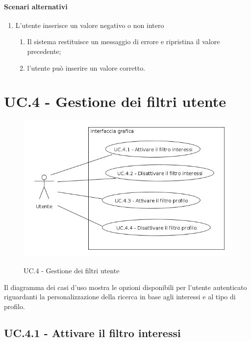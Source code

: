 \documentclass[10pt,a4paper,headinclude,footinclude,hidelinks]{scrreprt} %
\begin{document}
	\paragraph{Scenari alternativi}
	\begin{enumerate}
	\item L'utente inserisce un valore negativo o non intero
		\begin{enumerate}
		\item Il sistema restituisce un messaggio di errore e ripristina il valore precedente;
		\item l'utente può inserire un valore corretto.
		\end{enumerate}
	\end{enumerate}

	\section{UC.4 - Gestione dei filtri utente}
	\label{ch:stage:ar:uc:4}

	\begin{figure}[ht]
		\begin{center}
	    	\includegraphics[width=12cm]{uc_4.png}
			\label{gfx:uc:4}
			\caption{UC.4 - Gestione dei filtri utente}
		\end{center}
	\end{figure}

	Il diagramma dei casi d'uso mostra le opzioni disponibili per l'utente autenticato riguardanti la personalizzazione della ricerca in base agli interessi e al tipo di profilo.

	\subsection[UC.4.1]{UC.4.1 - Attivare il filtro interessi}
	\label{sec:stage:ar:uc:4_1}
\end{document}
